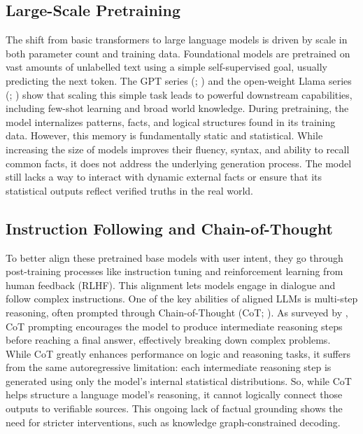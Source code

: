 \subsection{Large-Scale Pretraining}

The shift from basic transformers to large language models is driven by scale in both parameter count and training data. Foundational models are pretrained on vast amounts of unlabelled text using a simple self-supervised goal, usually predicting the next token. The GPT series (\citealt{brown2020gpt3}; \citealt{openai2024gpt4technicalreport}) and the open-weight Llama series (\citealt{touvron2023llama}; \citealt{dubey2024llama3}) show that scaling this simple task leads to powerful downstream capabilities, including few-shot learning and broad world knowledge. During pretraining, the model internalizes patterns, facts, and logical structures found in its training data. However, this memory is fundamentally static and statistical. While increasing the size of models improves their fluency, syntax, and ability to recall common facts, it does not address the underlying generation process. The model still lacks a way to interact with dynamic external facts or ensure that its statistical outputs reflect verified truths in the real world.

\subsection{Instruction Following and Chain-of-Thought}

To better align these pretrained base models with user intent, they go through post-training processes like instruction tuning and reinforcement learning from human feedback (RLHF). This alignment lets models engage in dialogue and follow complex instructions. One of the key abilities of aligned LLMs is multi-step reasoning, often prompted through Chain-of-Thought (CoT; \citealt{wei2022cot}). As surveyed by \citet{huang2023towards}, CoT prompting encourages the model to produce intermediate reasoning steps before reaching a final answer, effectively breaking down complex problems. While CoT greatly enhances performance on logic and reasoning tasks, it suffers from the same autoregressive limitation: each intermediate reasoning step is generated using only the model’s internal statistical distributions. So, while CoT helps structure a language model’s reasoning, it cannot logically connect those outputs to verifiable sources. This ongoing lack of factual grounding shows the need for stricter interventions, such as knowledge graph-constrained decoding.

